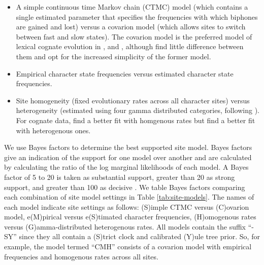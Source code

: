 \documentclass[]{article}
\providecommand{\tightlist}{%
  \setlength{\itemsep}{0pt}\setlength{\parskip}{0pt}}
\begin{document}
\begin{itemize}
\tightlist
\item
  A simple continuous time Markov chain (CTMC) model (which contains a single estimated parameter that specifies the frequencies with which biphones are gained and lost) versus a covarion model (which allows sites to switch between fast and slow states). The covarion model is the preferred model of lexical cognate evolution in \textcite{bouckaert_corrections_2012}, \textcite{bouckaert_origin_2018} and \textcite{kolipakam_bayesian_2018}, although \textcite[p.~219]{chang_ancestry-constrained_2015} find little difference between them and opt for the increased simplicity of the former model.
\item
  Empirical character state frequencies versus estimated character state frequencies.
\item
  Site homogeneity (fixed evolutionary rates across all character sites) versus heterogeneity (estimated using four gamma distributed categories, following \textcite{kolipakam_bayesian_2018}). For cognate data, \textcite{bouckaert_origin_2018} find a better fit with homgenous rates but \textcite{kolipakam_bayesian_2018} find a better fit with heterogenous ones.
\end{itemize}

We use Bayes factors to determine the best supported site model. Bayes factors give an indication of the support for one model over another and are calculated by calculating the ratio of the log marginal likelihoods of each model. A Bayes factor of 5 to 20 is taken as substantial support, greater than 20 as strong support, and greater than 100 as decisive \autocite{kass_bayes_1995}. We table Bayes factors comparing each combination of site model settings in Table \ref{tab:site-models}. The names of each model indicate site settings as follows: (S)imple CTMC versus (C)ovarion model, e(M)pirical versus e(S)timated character frequencies, (H)omogenous rates versus (G)amma-distributed heterogenous rates. All models contain the suffix ``-SY'' since they all contain a (S)trict clock and calibrated (Y)ule tree prior. So, for example, the model termed ``CMH'' consists of a covarion model with empirical frequencies and homogenous rates across all sites.
\end{document}
